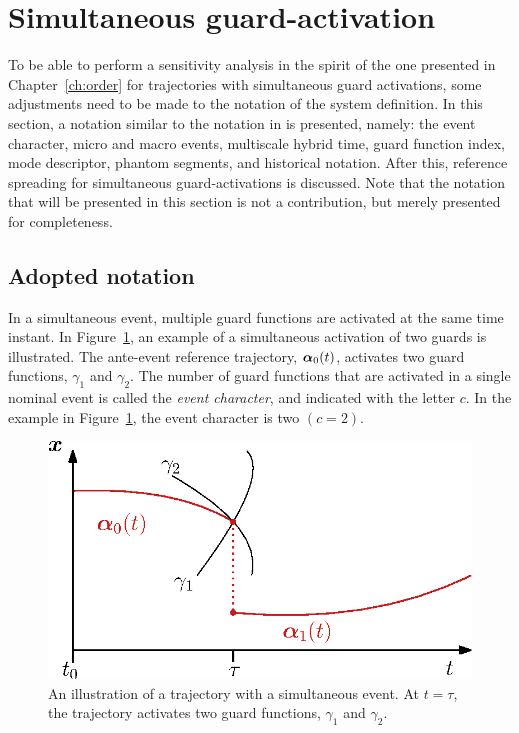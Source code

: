 \documentclass[../DC2017114Bouma.tex]{subfiles}
\begin{document}
\section{Simultaneous guard-activation}\label{sec:simguards}
To be able to perform a sensitivity analysis in the spirit of the one presented in Chapter~\ref{ch:order} for trajectories with simultaneous guard activations, some adjustments need to be made to the notation of the system definition. In this section, a notation similar to the notation in \cite{Rijnen2018} is presented, namely: the event character, micro and macro events, multiscale hybrid time, guard function index, mode descriptor, phantom segments, and historical notation. After this, reference spreading for simultaneous guard-activations is discussed. Note that the notation that will be presented in this section is not a contribution, but merely presented for completeness.

\subsection{Adopted notation}\label{sec:4not}
In a simultaneous event, multiple guard functions are activated at the same time instant. In Figure~\ref{fig:4simulexample}, an example of a simultaneous activation of two guards is illustrated. The ante-event reference trajectory, $\boldsymbol{\alpha}_0(t)$, activates two guard functions, $\gamma_1$ and $\gamma_2$. The number of guard functions that are activated in a single nominal event is called the \textit{event character}, and indicated with the letter $c$. In the example in Figure~\ref{fig:4simulexample}, the event character is two $(c = 2)$.

\begin{figure}[bt!]
\centering
\includegraphics[width=.45\textwidth]{simulexample.eps}\caption{An illustration of a trajectory with a simultaneous event. At $t=\tau$, the trajectory activates two guard functions, $\gamma_1$ and $\gamma_2$.} \label{fig:4simulexample}
\end{figure}
\end{document}
